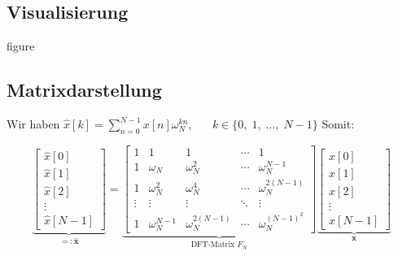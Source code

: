 \documentclass[11pt]{article}
\begin{document}
\vfill \null
\pagebreak

\subsection*{Visualisierung}
\vspace*{-0.5cm}
\textcolor{myred}{figure}

\subsection*{Matrixdarstellung}
\vspace*{-0.5cm}
Wir haben $\hat{x}[k] = \displaystyle\sum_{n=0}^{N-1} x[n]\omega_N^{kn}, \hspace{20pt} k \in \{ 0, \; 1, \; \dots, \; N-1 \}$ Somit:

$$\underbrace{\begin{bmatrix}
    \hat{x}[0] \\
    \hat{x}[1] \\
    \hat{x}[2] \\
    \vdots \\
    \hat{x}[N-1]
\end{bmatrix}}_{=: \hat{\mathbf{x}}} = \underbrace{\begin{bmatrix}
    1 & 1 & 1 & \cdots & 1 \\
    1 & \omega_N & \omega_N^2 & \cdots & \omega_N^{N-1} \\
    1 & \omega_N^2 & \omega_N^4 & \cdots & \omega_N^{2(N-1)} \\
    \vdots & \vdots & \vdots & \ddots & \vdots \\
    1 & \omega_N^{N-1} & \omega_N^{2(N-1)} & \cdots & \omega_N^{(N-1)^2}
\end{bmatrix}}_{\text{DFT-Matrix } F_N} \underbrace{\begin{bmatrix}
    x[0] \\
    x[1] \\
    x[2] \\
    \vdots \\
    x[N-1]
\end{bmatrix}}_{\mathbf{x}}$$
\end{document}

